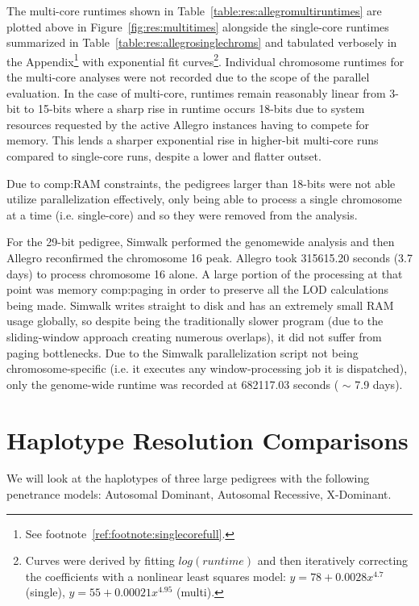 The multi-core runtimes shown in Table~\ref{table:res:allegromultiruntimes} are plotted above in Figure~\ref{fig:res:multitimes} alongside the single-core runtimes summarized in Table~\ref{table:res:allegrosinglechroms} and tabulated verbosely in the Appendix\footnote{See footnote~\ref{ref:footnote:singlecorefull}.} with exponential fit curves\footnote{Curves were derived by fitting $log(runtime)$ and then iteratively correcting the coefficients with a nonlinear least squares model: $ y = 78 + 0.0028x ^{4.7}$ (single), $ y = 55 + 0.00021x^{4.95}$ (multi).}. Individual chromosome runtimes for the multi-core analyses were not recorded due to the scope of the parallel evaluation. In the case of multi-core, runtimes remain reasonably linear from 3-bit to 15-bits where a sharp rise in runtime occurs 18-bits due to system resources requested by the active Allegro instances having to compete for memory. This lends a sharper exponential rise in higher-bit multi-core runs compared to single-core runs, despite a lower and flatter outset.

Due to \gls{comp:RAM} constraints, the pedigrees larger than 18-bits were not able utilize parallelization effectively, only being able to process a single chromosome at a time (i.e. single-core) and so they were removed from the analysis.

For the 29-bit pedigree, Simwalk performed the genomewide analysis and then Allegro reconfirmed the chromosome 16 peak. Allegro took 315615.20 seconds (3.7 days) to process chromosome 16 alone. A large portion of the processing at that point was memory \gls{comp:paging} in order to preserve all the LOD calculations being made. Simwalk writes straight to disk and has an extremely small RAM usage globally, so despite being the traditionally slower program (due to the sliding-window approach creating numerous overlaps), it did not suffer from paging bottlenecks. Due to the Simwalk parallelization script not being chromosome-specific (i.e. it executes any window-processing job it is dispatched), only the genome-wide runtime was recorded at 682117.03 seconds ( $\sim$ 7.9 days).



\section{Haplotype Resolution Comparisons}\label{ref:res:hapcomp}

We will look at the haplotypes of three large pedigrees with the following penetrance models: Autosomal Dominant, Autosomal Recessive, X-Dominant.

